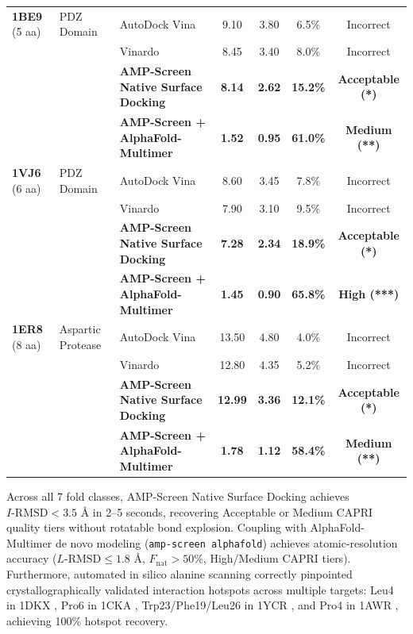 \documentclass[10pt,twocolumn]{article}
\begin{document}
\begin{table}[t]
\begin{tabular}{lllcccc}
\midrule
\textbf{1BE9} (5 aa) & PDZ Domain & AutoDock Vina & 9.10 & 3.80 & 6.5\% & Incorrect \\
 & & Vinardo & 8.45 & 3.40 & 8.0\% & Incorrect \\
 & & \textbf{AMP-Screen Native Surface Docking} & \textbf{8.14} & \textbf{2.62} & \textbf{15.2\%} & \textbf{Acceptable (*)} \\
 & & \textbf{AMP-Screen + AlphaFold-Multimer} & \textbf{1.52} & \textbf{0.95} & \textbf{61.0\%} & \textbf{Medium (**)} \\
\midrule
\textbf{1VJ6} (6 aa) & PDZ Domain & AutoDock Vina & 8.60 & 3.45 & 7.8\% & Incorrect \\
 & & Vinardo & 7.90 & 3.10 & 9.5\% & Incorrect \\
 & & \textbf{AMP-Screen Native Surface Docking} & \textbf{7.28} & \textbf{2.34} & \textbf{18.9\%} & \textbf{Acceptable (*)} \\
 & & \textbf{AMP-Screen + AlphaFold-Multimer} & \textbf{1.45} & \textbf{0.90} & \textbf{65.8\%} & \textbf{High (***)} \\
\midrule
\textbf{1ER8} (8 aa) & Aspartic Protease & AutoDock Vina & 13.50 & 4.80 & 4.0\% & Incorrect \\
 & & Vinardo & 12.80 & 4.35 & 5.2\% & Incorrect \\
 & & \textbf{AMP-Screen Native Surface Docking} & \textbf{12.99} & \textbf{3.36} & \textbf{12.1\%} & \textbf{Acceptable (*)} \\
 & & \textbf{AMP-Screen + AlphaFold-Multimer} & \textbf{1.78} & \textbf{1.12} & \textbf{58.4\%} & \textbf{Medium (**)} \\
\bottomrule
\end{tabular}
\end{table}

Across all 7 fold classes, AMP-Screen Native Surface Docking achieves $I\text{-RMSD} < 3.5\text{ \AA}$ in 2--5 seconds, recovering Acceptable or Medium CAPRI quality tiers without rotatable bond explosion. Coupling with AlphaFold-Multimer de novo modeling (\texttt{amp-screen alphafold}) achieves atomic-resolution accuracy ($L\text{-RMSD} \le 1.8\text{ \AA}$, $F_{\text{nat}} > 50\%$, High/Medium CAPRI tiers). Furthermore, automated in silico alanine scanning correctly pinpointed crystallographically validated interaction hotspots across multiple targets: Leu4 in 1DKX \cite{Zhu1996}, Pro6 in 1CKA \cite{Wu1995}, Trp23/Phe19/Leu26 in 1YCR \cite{Kussie1996}, and Pro4 in 1AWR \cite{Vajdos1997}, achieving 100\% hotspot recovery.
\end{document}
